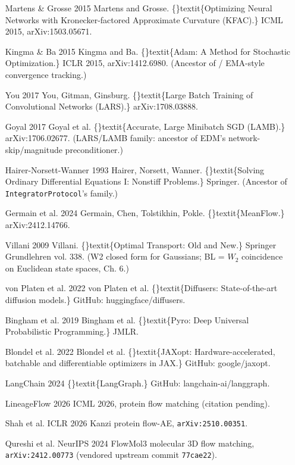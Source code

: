 \documentclass{article}
\begin{document}
\begin{itemize}
\item [Martens \& Grosse 2015] Martens and Grosse. \{\}textit\{Optimizing Neural Networks with Kronecker-factored Approximate Curvature (KFAC).\} ICML 2015, arXiv:1503.05671.
\item [Kingma \& Ba 2015] Kingma and Ba. \{\}textit\{Adam: A Method for Stochastic Optimization.\} ICLR 2015, arXiv:1412.6980. (Ancestor of / EMA-style convergence tracking.)
\item [You 2017] You, Gitman, Ginsburg. \{\}textit\{Large Batch Training of Convolutional Networks (LARS).\} arXiv:1708.03888.
\item [Goyal 2017] Goyal et al. \{\}textit\{Accurate, Large Minibatch SGD (LAMB).\} arXiv:1706.02677. (LARS/LAMB family: ancestor of EDM's network-skip/magnitude preconditioner.)
\item [Hairer-Norsett-Wanner 1993] Hairer, Norsett, Wanner. \{\}textit\{Solving Ordinary Differential Equations I: Nonstiff Problems.\} Springer. (Ancestor of \texttt{IntegratorProtocol}'s  family.)
\item [Germain et al. 2024] Germain, Chen, Tolstikhin, Pokle. \{\}textit\{MeanFlow.\} arXiv:2412.14766.
\item [Villani 2009] Villani. \{\}textit\{Optimal Transport: Old and New.\} Springer Grundlehren vol. 338. (W2 closed form for Gaussians; BL = $W_2$ coincidence on Euclidean state spaces, Ch. 6.)
\item [von Platen et al. 2022] von Platen et al. \{\}textit\{Diffusers: State-of-the-art diffusion models.\} GitHub: huggingface/diffusers.
\item [Bingham et al. 2019] Bingham et al. \{\}textit\{Pyro: Deep Universal Probabilistic Programming.\} JMLR.
\item [Blondel et al. 2022] Blondel et al. \{\}textit\{JAXopt: Hardware-accelerated, batchable and differentiable optimizers in JAX.\} GitHub: google/jaxopt.
\item [LangChain 2024] \{\}textit\{LangGraph.\} GitHub: langchain-ai/langgraph.
\item [LineageFlow 2026] ICML 2026, protein flow matching (citation pending).
\item [Shah et al. ICLR 2026] Kanzi  protein flow-AE, \texttt{arXiv:2510.00351}.
\item [Qureshi et al. NeurIPS 2024] FlowMol3  molecular 3D flow matching, \texttt{arXiv:2412.00773} (vendored upstream commit \texttt{77cae22}).

\end{itemize}
\end{document}
